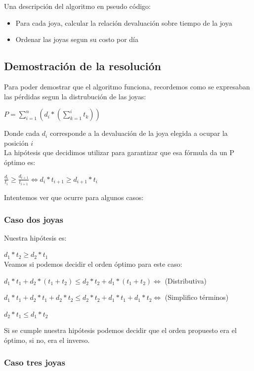 Una descripci\'on del algoritmo en pseudo c\'odigo:

\begin{itemize}
\item Para cada joya, calcular la relaci\'on devaluaci\'on sobre tiempo de la joya
\item Ordenar las joyas segun su costo por d\'ia
\end{itemize}

\subsection{Demostraci\'on de la resoluci\'on}

Para poder demostrar que el algoritmo funciona, recordemos como se expresaban las p\'erdidas segun la distrubuci\'on de las joyas:

$P = \sum\limits_{i=1}^n (d_{i}*( \sum\limits_{k=1}^i t_k ))$

Donde cada $d_i$ corresponde a la devaluaci\'on de la joya elegida a ocupar la posici\'on $i$ \\

La hip\'otesis que decidimos utilizar para garantizar que esa f\'ormula da un P \'optimo es:

$ \frac{d_{i}}{t_{i}} \geq \frac{d_{i+1}}{t_{i+1}} \Longleftrightarrow d_i*t_{i+1} \geq d_{i+1}*t_i $

Intentemos ver que ocurre para algunos casos:

\subsubsection*{Caso dos joyas}

Nuestra hip\'otesis es:

$d_1*t_2 \geq d_2*t_1$ \\

Veamos si podemos decidir el orden \'optimo para este caso:

$d_1*t_1 + d_2*(t_1 + t_2) \leq d_2*t_2 + d_1*(t_1 + t_2) \Longleftrightarrow $ (Distributiva)

$d_1*t_1 + d_2*t_1 + d_2*t_2 \leq  d_2*t_2 + d_1*t_1 + d_1*t_2 \Longleftrightarrow$ (Simplifico t\'erminos)

$d_2*t_1 \leq d_1*t_2$

Si se cumple nuestra hip\'otesis podemos decidir que el orden propuesto era el \'optimo, si no, era el inverso. \\

\subsubsection*{Caso tres joyas}

